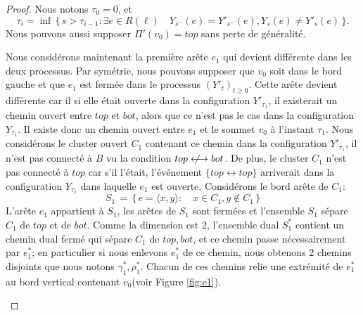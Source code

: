 \documentclass[titlepage,a4paper,12pt]{article}
\newcounter{cor}
\newcommand{\nlongleftrightarrow}{\longleftrightarrow \kern-15pt\not \kern15pt}
\begin{document}
\begin{proof}
Nous notons $\tau_0 = 0$, et $$\tau_i = \inf \, \big\{\,s > \tau_{i-1}: \exists e \in R(\ell)\quad Y_{s^-}(e) = Y'_{s^-}(e),Y_s(e) \neq Y'_s(e)\,\big\}.$$ Nous pouvons aussi supposer $\Pi'(v_0)=top$ sans perte de généralité. 

Nous considérons maintenant la première arête $e_1$ qui devient différente dans les deux processus. Par symétrie, nous pouvons supposer que $v_0$ soit dans le bord gauche et que $e_1$ est fermée dans le processus $(Y'_t)_{t\geqslant 0}$. Cette arête devient différente car il si elle était ouverte dans la configuration $Y'_{\tau_1}$, il existerait un chemin ouvert entre $top$ et $bot$, alors que ce n'est pas le cas dans la configuration $Y_{\tau_1}$. Il existe donc un chemin ouvert entre $e_1$ et le sommet $v_0$ à l'instant $\tau_1$. Nous considérons le cluster ouvert $C_1$ contenant ce chemin dans la configuration $Y'_{\tau_1}$, il n'est pas connecté à $B$ vu la condition $top\nlongleftrightarrow bot$. De plus, le cluster $C_1$ n'est pas connecté à $top$ car s'il l'était, l'événement $\{top\longleftrightarrow top\}$ arriverait dans la configuration $Y_{\tau_1}$ dans laquelle $e_1$ est ouverte. Considérons le bord arête de $C_1$:
$$ S_1 \,=\, \big\{\, e = \langle x,y\rangle :\quad x\in C_1, y\notin C_1\,\big\}
$$
L'arête $e_1$ appartient à $S_1$, les arêtes de $S_1$ sont fermées et l'ensemble $S_1$ sépare $C_1$ de $top$ et de $bot$. Comme la dimension est 2, l'ensemble dual $S_1^*$ contient un chemin dual fermé qui sépare $C_1$ de $top,bot$, et ce chemin passe nécessairement par $e_1^*$; en particulier si nous enlevons $e_1^*$ de ce chemin, nous obtenons 2 chemins disjoints que nous notons $\gamma_1^*, \rho_1^*$. Chacun de ces chemins relie une extrémité de $e_1^*$ au bord vertical contenant $v_0$(voir Figure \ref{fig:e1}). 
\begin{figure}[h]
\begin{minipage}{0.45\linewidth}
\center
{}
\end{minipage}
\end{figure}
\end{proof}
\end{document}
